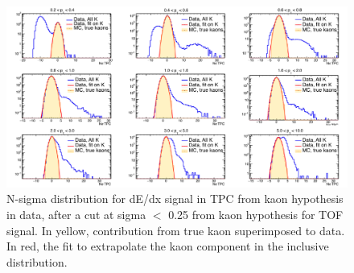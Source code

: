 \begin{figure}[!h]
 \centering
 \includegraphics[angle=0, width=15cm]{./FigCap5/KaonTPCFromTOF_DataMC.png}
 \caption{N-sigma distribution for dE/dx signal in TPC from kaon hypothesis in data, after a cut at sigma $<$ 0.25 from kaon hypothesis for TOF signal. In yellow, contribution from true kaon superimposed to data. In red, the fit to extrapolate the kaon component in the inclusive distribution.}
 \label{fig:DataKaonsTPC} 
\end{figure}

